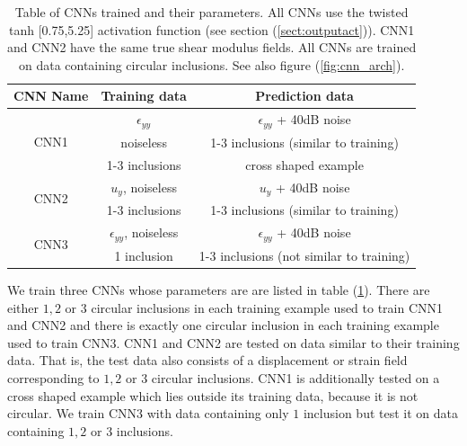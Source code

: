 \documentclass[12pt]{article}
\newcommand{\ra}[1]{\renewcommand{\arraystretch}{#1}}
\begin{document}
\begin{table}\centering
  \ra{1.3}
  \begin{tabular}{ccc}
    \toprule
    {CNN Name} &  {Training data}  & {Prediction data}\\
    \midrule
    \multirow{3}{*}{CNN1}    &  $\epsilon_{yy}$                           &  {$\epsilon_{yy}$ + 40dB noise}\\
                              &  noiseless                                & 1-3 inclusions (similar to training)\\
                              &  1-3 inclusions                           & cross shaped example\\
     \midrule
     \multirow{2}{*}{CNN2}    &  $u_{y}$, noiseless                        & {$u_{y}$ + 40dB noise}\\
                              &  1-3 inclusions                            &  1-3 inclusions (similar to training)\\
     \midrule
     \multirow{2}{*}{CNN3}    &  $\epsilon_{yy}$, noiseless                & {$\epsilon_{yy}$ + 40dB noise}\\
                              &  1 inclusion                               & 1-3 inclusions (not similar to training)\\
    \bottomrule
  \end{tabular}
  \caption{\label{table:cnnparams} Table of CNNs trained and their parameters. All CNNs use the twisted tanh [0.75,5.25] activation function (see section (\ref{sect:outputact})). CNN1 and CNN2 have the same true shear modulus fields. All CNNs are trained on data containing circular inclusions. See also figure (\ref{fig:cnn_arch}).} 
\end{table}

We train three CNNs whose parameters are are listed in table (\ref{table:cnnparams}). There are either $1,2$ or $3$ circular inclusions in each training example used to train CNN1 and CNN2 and there is exactly one circular inclusion in each training example used to train CNN3. CNN1 and CNN2 are tested on data similar to their training data. That is, the test data also consists of a displacement or strain field corresponding to  $1,2$ or $3$ circular inclusions.  CNN1 is additionally tested on a cross shaped example which lies outside its training data, because it is not circular. We train CNN3 with data containing only $1$ inclusion but test it on data containing $1,2$ or $3$ inclusions. 
\end{document}
